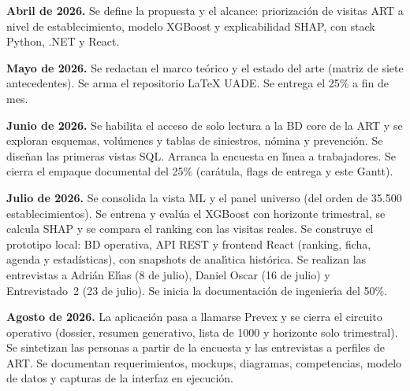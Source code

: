 \label{anexo:cronograma}

\textbf{Abril de 2026.}
Se define la propuesta y el alcance: priorizaci\'on de visitas ART a nivel de establecimiento, modelo XGBoost y explicabilidad SHAP, con stack Python, .NET y React.

\textbf{Mayo de 2026.}
Se redactan el marco te\'orico y el estado del arte (matriz de siete antecedentes).
Se arma el repositorio LaTeX UADE.
Se entrega el 25\% a fin de mes.

\textbf{Junio de 2026.}
Se habilita el acceso de solo lectura a la BD core de la ART y se exploran esquemas, vol\'umenes y tablas de siniestros, n\'omina y prevenci\'on.
Se dise\~nan las primeras vistas SQL.
Arranca la encuesta en l\'{\i}nea a trabajadores.
Se cierra el empaque documental del 25\% (car\'atula, flags de entrega y este Gantt).

\textbf{Julio de 2026.}
Se consolida la vista ML y el panel universo (del orden de 35.500 establecimientos).
Se entrena y eval\'ua el XGBoost con horizonte trimestral, se calcula SHAP y se compara el ranking con las visitas reales.
Se construye el prototipo local: BD operativa, API REST y frontend React (ranking, ficha, agenda y estad\'isticas), con snapshots de anal\'{\i}tica hist\'orica.
Se realizan las entrevistas a Adri\'an El\'{\i}as (8 de julio), Daniel Oscar (16 de julio) y Entrevistado~2 (23 de julio).
Se inicia la documentaci\'on de ingenier\'{\i}a del 50\%.

\textbf{Agosto de 2026.}
La aplicaci\'on pasa a llamarse Prevex y se cierra el circuito operativo (dossier, resumen generativo, lista de 1000 y horizonte solo trimestral).
Se sintetizan las personas a partir de la encuesta y las entrevistas a perfiles de ART.
Se documentan requerimientos, mockups, diagramas, competencias, modelo de datos y capturas de la interfaz en ejecuci\'on.


